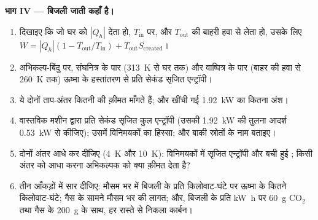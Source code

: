 \begin{problem}
\medskip
\noindent\textbf{भाग IV --- बिजली जाती कहाँ है।}
\begin{enumerate}[resume]
  \item दिखाइए कि जो  घर को $|Q_h|$ देता हो, $T_{\mathrm{in}}$ पर,
        और $T_{\mathrm{out}}$ की बाहरी हवा से लेता हो, उसके लिए
        $W = |Q_h|(1 - T_{\mathrm{out}}/T_{\mathrm{in}}) + T_{\mathrm{out}}S_{\mathrm{created}}$।
  \item अभिकल्प-बिंदु पर, संघनित्र के पार (\qty{313}{K} से घर तक) और
        वाष्पित्र के पार (बाहर की हवा से \qty{260}{K} तक) ऊष्मा के
        हस्तांतरण से प्रति सेकंड सृजित एन्ट्रॉपी।
  \item ये दोनों ताप-अंतर कितनी  की क़ीमत माँगते हैं; और खींची
        गई \qty{1.92}{kW} का कितना अंश।
  \item वास्तविक मशीन द्वारा प्रति सेकंड सृजित कुल एन्ट्रॉपी (उसकी
        \qty{1.92}{kW} की तुलना आदर्श \qty{0.53}{kW} से कीजिए); उसमें
        विनिमयकों का हिस्सा; और बाकी स्रोतों के नाम बताइए।
  \item दोनों अंतर आधे कर दीजिए (\qty{4}{K} और \qty{10}{K}): विनिमयकों में
        सृजित एन्ट्रॉपी और बची हुई ; किसी अंतर को आधा करना
        अभिकल्पक को क्या क़ीमत देता है?
  \item तीन आँकड़ों में सार दीजिए: मौसम भर में बिजली के प्रति किलोवाट-घंटे
        पर ऊष्मा के कितने किलोवाट-घंटे; गैस के सामने मौसम भर की लागत; और,
        बिजली के प्रति \unit{kW h} पर \qty{60}{g} CO$_2$ तथा गैस के
        \qty{200}{g} के साथ, हर रास्ते से निकला कार्बन।
\end{enumerate}
\end{problem}
